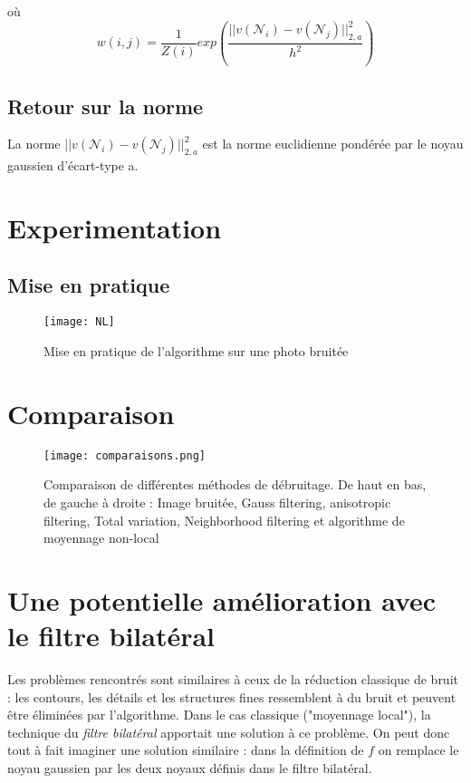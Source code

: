 \documentclass{article}
\begin{document}
où $$w(i,j) = \frac{1}{Z(i)}exp(\frac{||v(\mathcal{N}_i)-v(\mathcal{N}_{j})||_{2,a}^{2}}{h^{2}})$$
\subsection{Retour sur la norme}
La norme $||v(\mathcal{N}_{i})-v(\mathcal{N}_j)||_{2,a}^{2}$ est la norme euclidienne pondérée par le noyau gaussien d'écart-type a.



\section{Experimentation}
\subsection{Mise en pratique}
\begin{figure}[ht!]
    \centering
    \texttt{[image: NL]}
    \caption{Mise en pratique de l'algorithme sur une photo bruitée}
\end{figure}

\section{Comparaison}
\begin{figure}[ht!]
    \centering
    \texttt{[image: comparaisons.png]}
    \caption{Comparaison de différentes méthodes de débruitage. De haut en bas, de gauche à droite : Image bruitée, Gauss filtering, anisotropic filtering, Total variation, Neighborhood filtering et algorithme de moyennage non-local}
\end{figure}

\section{Une potentielle amélioration avec le filtre bilatéral}
Les problèmes rencontrés sont similaires à ceux de la réduction classique de bruit : les contours, les détails et les structures fines ressemblent à du bruit et peuvent être éliminées par l'algorithme. Dans le cas classique ("moyennage local"), la technique du \textit{filtre bilatéral} apportait une solution à ce problème. On peut donc tout à fait imaginer une solution similaire : dans la définition de $f$ on remplace le noyau gaussien par les deux noyaux définis dans le filtre bilatéral.  
\end{document}
